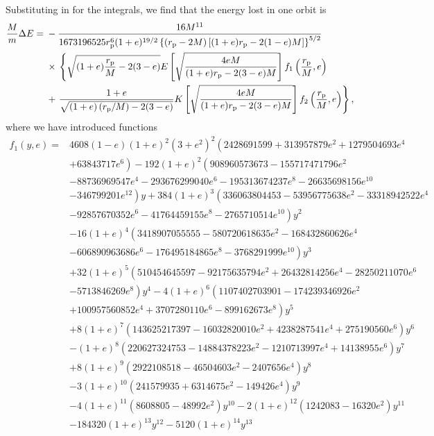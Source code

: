 Substituting in for the integrals, we find that the energy lost in one orbit is
\begin{align}
\frac{M}{m} \Delta E = {} & -\frac{16 M^{11}}{1673196525 r_\mathrm{p}^{6} (1 + e)^{{19}/{2}} \left\{\left(r_\mathrm{p} - 2 M\right)\left[(1 + e)r_\mathrm{p} - 2(1 - e)M\right]\right\}^{{5}/{2}}} \nonumber \\
 {} & \times {} \left\{\sqrt{( 1+ e)\frac{r_\mathrm{p}}{M} - 2(3 - e)} E\left[\sqrt{\frac{4 e M}{(1+e) r_\mathrm{p} - 2(3 - e)M}}\right] f_{1}\left(\frac{r_\mathrm{p}}{M}, e\right) \right. \nonumber \\
   {} & + \left. \frac{1 + e}{\sqrt{(1 + e)\left(r_\mathrm{p}/M\right)- 2 (3 - e)}} K\left[\sqrt{\frac{4 e M}{(1+e) r_\mathrm{p} - 2(3 - e)M}}\right] f_{2} \left(\frac{r_\mathrm{p}}{M}, e\right)\right\},
\end{align}
where we have introduced functions
\begin{align}
f_1(y, e) = {} & 4608 (1 - e) (1 + e)^2 \left(3 + e^2\right)^2 \left(2428691599+313957879 e^2 + 1279504693 e^4 \right. \nonumber \\
 {} & + \left. 63843717 e^6\right)-192 (1 + e)^2 \left(908960573673 - 155717471796 e^2 \right.\nonumber \\
 {} & - \left. 88736969547 e^4 - 293676299040 e^6 - 195313674237 e^8 - 26635698156 e^{10} \right. \nonumber \\
 {} & - \left. 346799201 e^{12}\right) y + 384 (1+e)^3 \left(336063804453 - 53956775638 e^2 - 33318942522 e^4 \right. \nonumber \\
 {} & - \left. 92857670352 e^6 - 41764459155 e^8 - 2765710514 e^{10}\right) y^2 \nonumber \\
 {} & - \left. 16 (1 + e)^4 \left(3418907055555 - 580720618635 e^2 - 168432860626 e^4 \right.\right. \nonumber \\
 {} & - \left. 606890963686 e^6 - 176495184865 e^8 - 3768291999 e^{10}\right) y^3 \nonumber \\
 {} & + \left. 32 (1 + e)^5 \left(510454645597 - 92175635794 e^2 + 26432814256 e^4 - 28250211070 e^6 \right.\right. \nonumber \\
 {} & - \left. 5713846269 e^8\right) y^4 - 4 (1 + e)^6 \left(1107402703901 - 174239346926 e^2 \right. \nonumber \\
 {} & + \left. 100957560852 e^4 + 3707280110 e^6 - 899162673 e^8\right) y^5 \nonumber \\ 
 {} & + \left. 8 (1 + e)^7 \left(143625217397 - 16032820010 e^2 + 4238287541 e^4 + 275190560 e^6\right) y^6 \right. \nonumber \\
 {} & - \left. (1 + e)^8 \left(220627324753 - 14884378223 e^2 - 1210713997 e^4 + 14138955 e^6\right) y^7 \right. \nonumber \\
 {} & + \left. 8 (1 + e)^9 \left(2922108518 - 46504603 e^2 - 2407656 e^4\right) y^8 \right. \nonumber \\
 {} & - \left. 3 (1 + e)^{10} \left(241579935 + 6314675 e^2 - 149426 e^4\right) y^9 \right. \nonumber \\
 {} & - \left. 4 (1 + e)^{11} \left(8608805 - 48992 e^2\right) y^{10} - 2 (1 + e)^{12} \left(1242083 - 16320 e^2\right) y^{11} \right. \nonumber \\
 {} & - \left. 184320 (1 + e)^{13} y^{12} - 5120 (1 + e)^{14} y^{13} \right.
\end{align}
